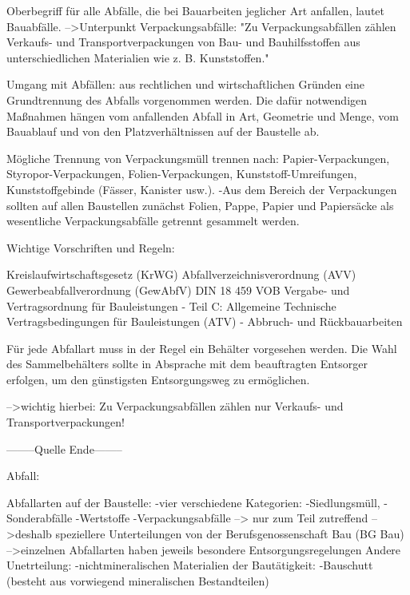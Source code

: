 Oberbegriff für alle Abfälle, die bei Bauarbeiten jeglicher Art anfallen, lautet Bauabfälle. 
        -->Unterpunkt Verpackungsabfälle: 
                        "Zu Verpackungsabfällen zählen Verkaufs- und Transportverpackungen von Bau- und Bauhilfsstoffen aus unterschiedlichen Materialien wie z. B. Kunststoffen."

Umgang mit Abfällen:
    aus rechtlichen und wirtschaftlichen Gründen eine Grundtrennung des Abfalls vorgenommen werden. Die dafür notwendigen Maßnahmen hängen vom anfallenden Abfall in Art, Geometrie und Menge, vom Bauablauf und von den Platzverhältnissen auf der Baustelle ab.

Mögliche Trennung von Verpackungsmüll trennen nach:
        Papier-Verpackungen, Styropor-Verpackungen, Folien-Verpackungen, Kunststoff-Umreifungen, Kunststoffgebinde (Fässer, Kanister usw.).
    -Aus dem Bereich der Verpackungen sollten auf allen Baustellen zunächst Folien, Pappe, Papier und Papiersäcke als wesentliche Verpackungsabfälle getrennt gesammelt werden.

Wichtige Vorschriften und Regeln:

    Kreislaufwirtschaftsgesetz (KrWG)
    Abfallverzeichnisverordnung (AVV)
    Gewerbeabfallverordnung (GewAbfV)
    DIN 18 459 VOB Vergabe- und Vertragsordnung für Bauleistungen - Teil C: Allgemeine Technische Vertragsbedingungen für Bauleistungen (ATV) - Abbruch- und Rückbauarbeiten
    
    Für jede Abfallart muss in der Regel ein Behälter vorgesehen werden. Die Wahl des Sammelbehälters sollte in Absprache mit dem beauftragten Entsorger erfolgen, um den günstigsten Entsorgungsweg zu ermöglichen.

-->wichtig hierbei: Zu Verpackungsabfällen zählen nur Verkaufs- und                                        Transportverpackungen!  

--------Quelle Ende--------



Abfall:

    Abfallarten auf der Baustelle:
        -vier verschiedene Kategorien:  -Siedlungsmüll, 
                                    -Sonderabfälle
                                    -Wertstoffe 
                                    -Verpackungsabfälle
            --> nur zum Teil zutreffend
                -->deshalb speziellere Unterteilungen von der Berufsgenossenschaft Bau (BG    Bau)
                -->einzelnen Abfallarten haben jeweils besondere Entsorgungsregelungen
        Andere Unetrteilung:
        -nichtmineralischen Materialien der Bautätigkeit:
        -Bauschutt (besteht aus vorwiegend mineralischen Bestandteilen)
    


